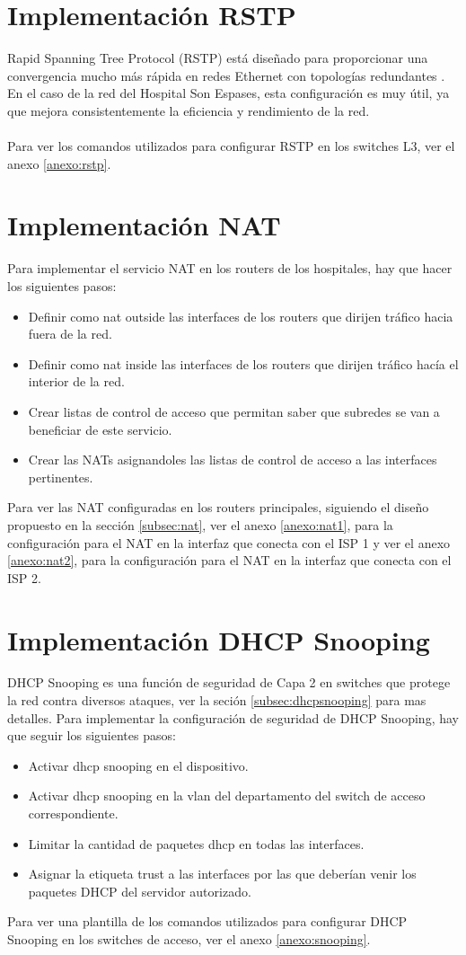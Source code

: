 \section{Implementación RSTP}
Rapid Spanning Tree Protocol (RSTP) está diseñado para proporcionar una convergencia mucho más rápida en redes Ethernet con topologías redundantes \cite{cisco_rstp_8021w}. En el caso de la red del Hospital Son Espases, esta configuración es muy útil, ya que mejora consistentemente la eficiencia y rendimiento de la red.
\\ \\
Para ver los comandos utilizados para configurar RSTP en los switches L3, ver el anexo \ref{anexo:rstp}.
\section{Implementación NAT}
Para implementar el servicio NAT en los routers de los hospitales, hay que hacer los siguientes pasos:
\begin{itemize}
    \item Definir como nat outside las interfaces de los routers que dirijen tráfico hacia fuera de la red.
    \item Definir como nat inside las interfaces de los routers que dirijen tráfico hacía el interior de la red.
    \item Crear listas de control de acceso que permitan saber que subredes se van a beneficiar de este servicio.
    \item Crear las NATs asignandoles las listas de control de acceso a las interfaces pertinentes.
\end{itemize}
Para ver las NAT configuradas en los routers principales, siguiendo el diseño propuesto en la sección \ref{subsec:nat}, ver el anexo \ref{anexo:nat1}, para la configuración para el NAT en 
la interfaz que conecta con el ISP 1 y ver el anexo \ref{anexo:nat2}, para la configuración para el NAT en la interfaz que conecta con el ISP 2.
\section{Implementación DHCP Snooping}
DHCP Snooping es una función de seguridad de Capa 2 en switches que protege la red contra diversos ataques, ver la seción \ref{subsec:dhcpsnooping} para mas detalles. Para implementar la configuración de seguridad de DHCP Snooping, hay que seguir los siguientes pasos:
\begin{itemize}
    \item Activar dhcp snooping en el dispositivo.
    \item Activar dhcp snooping en la vlan del departamento del switch de acceso correspondiente.
    \item Limitar la cantidad de paquetes dhcp en todas las interfaces.
    \item Asignar la etiqueta trust a las interfaces por las que deberían venir los paquetes DHCP del servidor autorizado.
\end{itemize}
Para ver una plantilla de los comandos utilizados para configurar DHCP Snooping en los switches de acceso, ver el anexo \ref{anexo:snooping}.
